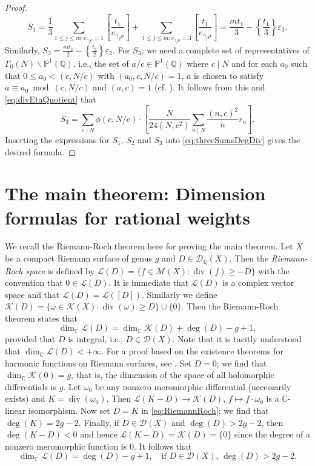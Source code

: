 \documentclass[12pt]{amsart}
\numberwithin{equation}{section}
\theoremstyle{plain}
\theoremstyle{definition}
\theoremstyle{remark}
\renewcommand\div{\mathop{\mathrm{div}}}
\newcommand\numQ{\mathbb{Q}}
\newcommand\numC{\mathbb{C}}
\newcommand\projQ{\mathbb{P}^1(\mathbb{Q})}
\begin{document}
\begin{proof}
\begin{equation*}
S_1=\frac{1}{3}\sum_{1 \leq j \leq m\colon e_{\gamma_j\rho}=1}\left[\frac{t_1}{e_{\gamma_j\rho}}\right] + \sum_{1 \leq j \leq m\colon e_{\gamma_j\rho}=3}\left[\frac{t_1}{e_{\gamma_j\rho}}\right]=\frac{mt_1}{3}-\left\{\frac{t_1}{3}\right\}\varepsilon_3.
\end{equation*}
Similarly, $S_2=\frac{mt_2}{2}-\left\{\frac{t_2}{2}\right\}\varepsilon_2$. For $S_3$, we need a complete set of representatives of $\Gamma_0(N)\backslash\projQ$, i.e., the set of $a/c\in\projQ$ where $c\mid N$ and for each $a_0$ such that $0 \leq a_0 < (c,N/c)$ with $(a_0,c,N/c)=1$, $a$ is chosen to satisfy $a\equiv a_0 \bmod (c,N/c)$ and $(a,c)=1$ (cf. \cite[Corollary 6.3.23]{CS17}). It follows from this and \eqref{eq:divEtaQuotient} that
\begin{equation*}
S_3=\sum_{c\mid N}\phi(c,N/c)\cdot\left[\frac{N}{24(N,c^2)}\sum_{n \mid N}\frac{(n,c)^2}{n}r_n\right].
\end{equation*}
Inserting the expressions for $S_1$, $S_2$ and $S_3$ into \eqref{eq:threeSumsDegDiv} gives the desired formula.
\end{proof}


\section{The main theorem: Dimension formulas for rational weights}
\label{sec:Dimension formulas}
We recall the Riemann-Roch theorem here for proving the main theorem. Let $X$ be a compact Riemann surface of genus $g$ and $D\in\mathscr{D}_\numQ(X)$. Then the \emph{Riemann-Roch space} is defined by $\mathscr{L}(D)=\{f\in\mathscr{M}(X)\colon\div(f)\geq-D\}$ with the convention that $0\in\mathscr{L}(D)$. It is immediate that $\mathscr{L}(D)$ is a complex vector space and that $\mathscr{L}(D)=\mathscr{L}([D])$. Similarly we define $\mathscr{K}(D)=\{\omega\in\mathscr{K}(X)\colon\div(\omega)\geq D\}\cup\{0\}$. Then the Riemann-Roch theorem states that
\begin{equation}
\label{eq:RiemannRoch}
\dim_\numC\mathscr{L}(D)=\dim_\numC\mathscr{K}(D)+\deg(D)-g+1,
\end{equation}
provided that $D$ is integral, i.e., $D\in\mathscr{D}(X)$. Note that it is tacitly understood that $\dim_\numC\mathscr{L}(D)<+\infty$. For a proof based on the existence theorems for harmonic functions on Riemann surfaces, see \cite[p. 249]{Fri11}. Set $D=0$; we find that $\dim_\numC\mathscr{K}(0)=g$, that is, the dimension of the space of all holomorphic differentials is $g$. Let $\omega_0$ be any nonzero meromorphic differential (necessarily exists) and $K=\div(\omega_0)$. Then $\mathscr{L}(K-D)\to\mathscr{K}(D)$, $f\mapsto f\cdot\omega_0$ is a $\numC$-linear isomorphism. Now set $D=K$ in \eqref{eq:RiemannRoch}; we find that $\deg(K)=2g-2$. Finally, if $D\in\mathscr{D}(X)$ and $\deg(D)>2g-2$, then $\deg(K-D)<0$ and hence $\mathscr{L}(K-D)=\mathscr{K}(D)=\{0\}$ since the degree of a nonzero meromorphic function is $0$. It follows that
\begin{equation}
\label{eq:RiemannRochSpecial}
\dim_\numC\mathscr{L}(D)=\deg(D)-g+1,\quad\text{if } D\in\mathscr{D}(X),\,\deg(D)>2g-2.
\end{equation}
\end{document}
